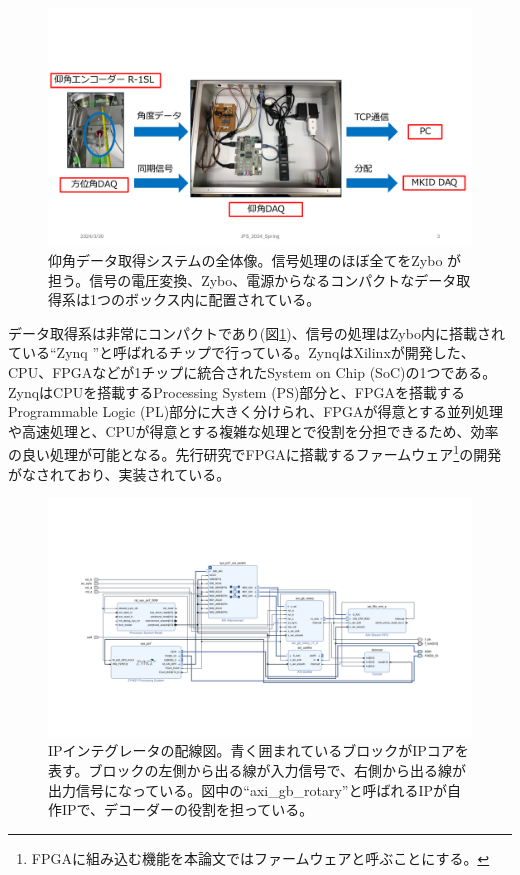 \begin{figure}[htbp]
  \centering
  \includegraphics[width=1.0\columnwidth]{4_elDAQ/figs/el_daq_box.pdf}
  \caption{仰角データ取得システムの全体像。信号処理のほぼ全てをZybo \cite{Zybo}が担う。信号の電圧変換、Zybo、電源からなるコンパクトなデータ取得系は1つのボックス内に配置されている。}
  \label{GB_daq_box}
\end{figure}

データ取得系は非常にコンパクトであり(図\ref{GB_daq_box})、信号の処理はZybo内に搭載されている``Zynq \cite{Zynq}''と呼ばれるチップで行っている。ZynqはXilinxが開発した、CPU、FPGAなどが1チップに統合されたSystem on Chip (SoC)の1つである。ZynqはCPUを搭載するProcessing System (PS)部分と、FPGAを搭載するProgrammable Logic (PL)部分に大きく分けられ、FPGAが得意とする並列処理や高速処理と、CPUが得意とする複雑な処理とで役割を分担できるため、効率の良い処理が可能となる。先行研究でFPGAに搭載するファームウェア\footnote{FPGAに組み込む機能を本論文ではファームウェアと呼ぶことにする。}の開発がなされており、実装されている。

\begin{figure}[htbp]
  \centering
  \includegraphics[width=1.0\columnwidth]{4_elDAQ/figs/block_diagram.pdf}
  \caption{IPインテグレータの配線図。青く囲まれているブロックがIPコアを表す。ブロックの左側から出る線が入力信号で、右側から出る線が出力信号になっている。図中の``axi\_gb\_rotary''と呼ばれるIPが自作IPで、デコーダーの役割を担っている。}
  \label{block_diagram}
\end{figure}

